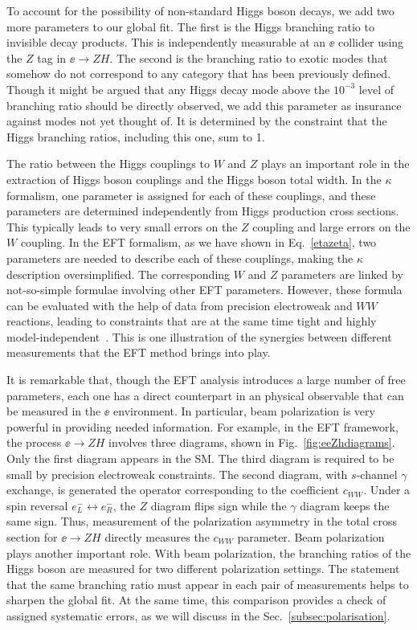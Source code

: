 To account for the possibility of non-standard Higgs boson decays, we
add two more parameters to our global fit.  The first is the Higgs branching
ratio to invisible decay products.   This is independently measurable
at an $\ee$ collider using the $Z$ tag in $\ee\to ZH$.  The second is
the branching ratio to exotic modes that somehow do not correspond to
any category that has been previously defined.   Though it might be
argued that any Higgs decay mode above the $10^{-3}$ level of
branching ratio should be directly observed, we add this parameter 
as insurance against modes not yet thought of.  It is determined by the constraint that the 
Higgs branching ratios, including this one, sum to 1.

The ratio between the Higgs couplings to $W$ and $Z$ plays an
important role in the extraction of Higgs boson couplings and the
Higgs boson total width.   In the
$\kappa$ formalism, one parameter is assigned for each of these
couplings, and these parameters are determined independently  from Higgs production
cross sections.   This typically leads to very small errors on the $Z$
coupling and large  errors on the $W$ coupling.  In the EFT
formalism, as we have shown in Eq.~\ref{etazeta}, two
parameters are needed to describe each of these couplings, making the
$\kappa$ description oversimplified.   The
corresponding $W$ and $Z$ parameters are linked by
not-so-simple formulae involving other EFT parameters.  However, these
formula can be evaluated with the help of data from precision
electroweak and $WW$ reactions, leading to  constraints that are at
the same time tight and highly
model-independent~\cite{Barklow:2017awn}.  This is one illustration of
the synergies between different measurements that the EFT method
brings into play. 

It is remarkable that, though the EFT analysis introduces a large
number of free parameters, each one has a direct counterpart in an
physical observable that can be measured in the $\ee$ environment. 
In particular, beam polarization is very powerful in providing needed
information.  For example, in the EFT framework, the process $\ee\to
ZH$ involves three diagrams, shown in Fig.~\ref{fig:eeZhdiagrams}.
Only the first diagram appears in the SM.   The third diagram is
required to be small by precision electroweak constraints.  The second
diagram, with $s$-channel $\gamma$ exchange,  is generated the
operator 
corresponding to the coefficient $c_{WW}$.  Under a spin reversal $e^-_L
\leftrightarrow e^-_R$, the $Z$ diagram flips sign while the 
$\gamma$ diagram keeps the same sign.  Thus,  measurement of the 
polarization asymmetry  in the total cross section for $\ee\to ZH$
directly measures the $c_{WW}$ parameter.   Beam polarization plays
another important role.  With beam polarization, the branching ratios
of the   Higgs boson are measured for  two different   polarization
settings.   The statement that the same branching ratio must appear in
each pair of measurements helps to sharpen the global fit.  At the
same time, this comparison provides a check of assigned systematic
errors, as we will discuss in the Sec.~\ref{subsec:polarisation}. 



